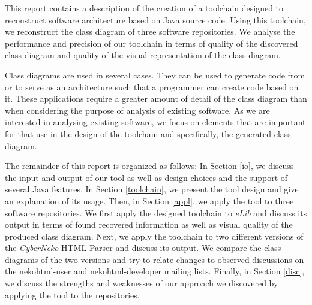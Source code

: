 This report contains a description of the creation of a toolchain designed to reconstruct software architecture based on Java source code.
Using this toolchain, we reconstruct the class diagram of three software repositories. We analyse the performance and precision of our toolchain in terms of quality of the discovered class diagram and quality of the visual representation of the class diagram.

Class diagrams are used in several cases. 
They can be used to generate code from or to serve as an architecture such that a programmer can create code based on it.
These applications require a greater amount of detail of the class diagram than when considering the purpose of analysis of existing software.
As we are interested in analysing existing software, we focus on elements that are important for that use in the design of the toolchain and specifically, the generated class diagram.

The remainder of this report is organized as follows:
In Section \ref{io}, we discuss the input and output of our tool as well as design choices and the support of several Java features.
In Section \ref{toolchain}, we present the tool design and give an explanation of its usage. 
Then, in Section \ref{appl}, we apply the tool to three software repositories. 
We first apply the designed toolchain to \textit{eLib} and discuss its output in terms of found recovered information as well as visual quality of the produced class diagram. 
Next, we apply the toolchain to two different versions of the \textit{CyberNeko} HTML Parser and discuss its output. 
We compare the class diagrams of the two versions and try to relate changes to observed discussions on the nekohtml-user and nekohtml-developer mailing lists. 
Finally, in Section \ref{disc}, we discuss the strengths and weaknesses of our approach we discovered by applying the tool to the repositories.

